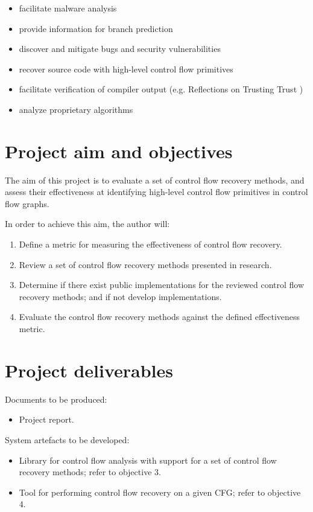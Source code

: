\documentclass[12pt, a4paper]{article}
\begin{document}
\begin{itemize}
	\item facilitate malware analysis
	\item provide information for branch prediction
	\item discover and mitigate bugs and security vulnerabilities
	\item recover source code with high-level control flow primitives
	\item facilitate verification of compiler output (e.g. Reflections on Trusting Trust \cite{trusting_trust})
	\item analyze proprietary algorithms
\end{itemize}

\section{Project aim and objectives}

The aim of this project is to evaluate a set of control flow recovery methods, and assess their effectiveness at identifying high-level control flow primitives in control flow graphs.

In order to achieve this aim, the author will:

\begin{enumerate}
	\item Define a metric for measuring the effectiveness of control flow recovery.
	\item Review a set of control flow recovery methods presented in research.
	\item Determine if there exist public implementations for the reviewed control flow recovery methods; and if not develop implementations.
	\item Evaluate the control flow recovery methods against the defined effectiveness metric.
\end{enumerate}

\section{Project deliverables}

Documents to be produced:

\begin{itemize}
	\item Project report.
\end{itemize}

System artefacts to be developed:

\begin{itemize}
	\item Library for control flow analysis with support for a set of control flow recovery methods; refer to objective 3.
	\item Tool for performing control flow recovery on a given CFG; refer to objective 4.
\end{itemize}
\end{document}
